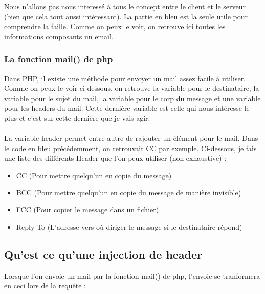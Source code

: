 \documentclass{article}
\begin{document}
Nous n'allons pas nous interessé à tous le concept entre le client et le serveur (bien que cela tout aussi intéressant). La partie en bleu est la seule utile pour comprendre la faille. Comme on peux le voir, on retrouve ici toutes les informations composants un email.

\subsubsection{La fonction mail() de php}

Dans PHP, il existe une méthode pour envoyer un mail assez facile à utiliser. Comme on peux le voir ci-dessous, on retrouve la variable pour le destinataire, la variable pour le sujet du mail, la variable pour le corp du message et une variable pour les headers du mail. Cette dernière variable est celle qui nous intéresse le plus et c'est sur cette dernière que je vais agir.
\vspace{0.2cm}\\
\vspace{0cm}\\
La variable header permet entre autre de rajouter un élément pour le mail. Dans le code en bleu précédemment, on retrouvait CC par exemple. Ci-dessous, je fais une liste des différents Header que l'on peux utiliser (non-exhaustive) :\\
\begin{itemize}
  \item CC (Pour mettre quelqu'un en copie du message)
  \item BCC (Pour mettre quelqu'un en copie du message de manière invisible)
  \item FCC (Pour copier le message dans un fichier)
  \item Reply-To (L'adresse vers où diriger le message si le destinataire répond)
\end{itemize}

\subsection{Qu'est ce qu'une injection de header}

Lorsque l'on envoie un mail par la fonction mail() de php, l'envoie se tranformera en ceci lors de la requête :\\
\vspace{0.1cm}\\
\end{document}
